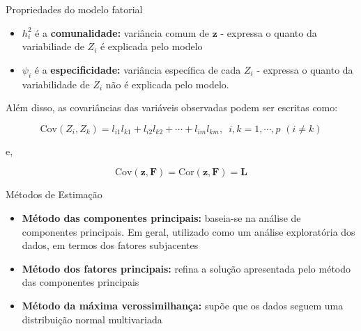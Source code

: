 \documentclass[
  ignorenonframetext,
  aspectratio=169,
]{beamer}
\providecommand{\tightlist}{%
  \setlength{\itemsep}{0pt}\setlength{\parskip}{0pt}}
\begin{document}
\begin{frame}{Propriedades do modelo fatorial}
\label{propriedades-do-modelo-fatorial-1}
\begin{itemize}
\tightlist
\item
  \(h_i^2\) é a \textbf{comunalidade:} variância comum de
  \(\boldsymbol{z}\) - expressa o quanto da variabiliade de \(Z_i\) é
  explicada pelo modelo
\end{itemize}

\vspace{0.2cm}

\begin{itemize}
\tightlist
\item
  \(\psi_i\) é a \textbf{especificidade:} variância específica de cada
  \(Z_i\) - expressa o quanto da variabilidade de \(Z_i\) não é
  explicada pelo modelo.
\end{itemize}

\pause

Além disso, as covariâncias das variáveis observadas podem ser escritas
como:

\vspace{-0.3cm}

\[\text{Cov}(Z_i, Z_k) = {l_{i1}l_{k1} + l_{i2}l_{k2} + \cdots + l_{im}l_{km}}, \,\,\, i,k = 1, \cdots, p \,\,(i\neq k)\]

\pause

e,

\[\text{Cov}(\boldsymbol{z}, \boldsymbol{F}) = \text{Cor}(\boldsymbol{z}, \boldsymbol{F}) = \boldsymbol{L}\]
\end{frame}

\begin{frame}{Métodos de Estimação}
\label{muxe9todos-de-estimauxe7uxe3o}
\begin{itemize}
\tightlist
\item
  \textbf{Método das componentes principais:} baseia-se na análise de
  componentes principais. Em geral, utilizado como um análise
  exploratória dos dados, em termos dos fatores subjacentes
\end{itemize}

\pause

\begin{itemize}
\tightlist
\item
  \textbf{Método dos fatores principais:} refina a solução apresentada
  pelo método das componentes principais
\end{itemize}

\pause

\begin{itemize}
\tightlist
\item
  \textbf{Método da máxima verossimilhança:} supõe que os dados seguem
  uma distribuição normal multivariada
\end{itemize}
\end{frame}
\end{document}
